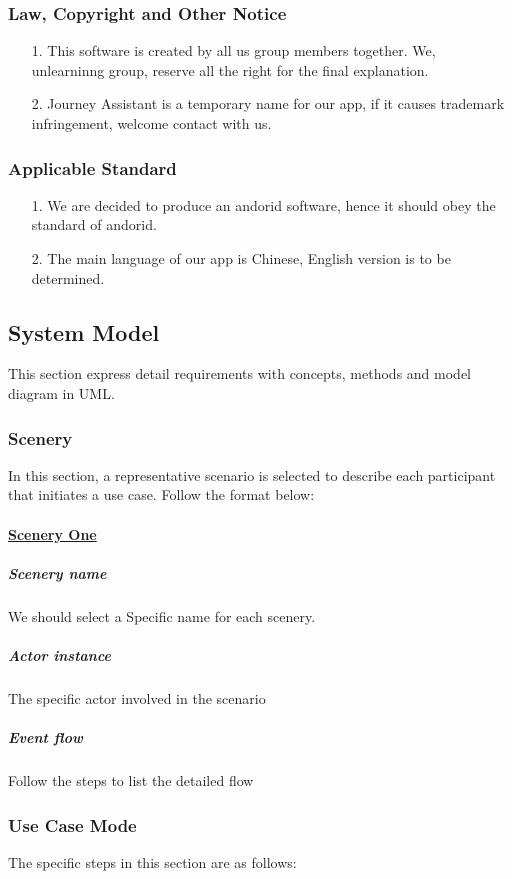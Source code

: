 \documentclass[10pt]{article}
\begin{document}
\subsubsection{Law, Copyright and Other Notice}
\begin{itemize}
	\item[1.]This software is created by all us group members together. We, unlearninng group, reserve all the right for the final explanation.
	\item[2.] Journey Assistant is a temporary name for our app, if it causes trademark infringement, welcome contact with us.
	
\end{itemize}

\subsubsection{Applicable Standard}
\begin{itemize}
	\item[1.] We are decided to produce an andorid software, hence it should obey the standard of andorid.
	\item[2.] The main language of our app is Chinese, English version is to be determined.
	
\end{itemize}

\subsection{System Model}
This section express detail requirements with concepts, methods and model diagram in UML.

\subsubsection{Scenery}
In this section, a representative scenario is selected to describe each participant that initiates a use case. Follow the format below:

\paragraph{\underline{Scenery One}}
\subparagraph{Scenery name} We should select a Specific name for each scenery.
\subparagraph{Actor instance} The specific actor involved in the scenario
\subparagraph{Event flow} Follow the steps to list the detailed flow

\subsubsection{Use Case Mode}
The specific steps in this section are as follows:
\end{document}
